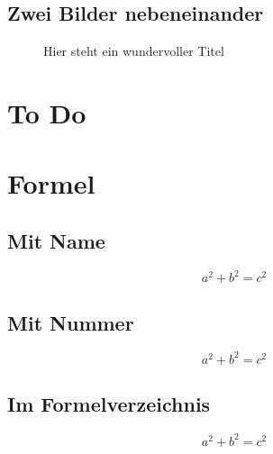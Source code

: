 \subsection{Zwei Bilder nebeneinander}
\begin{figure}[H]
	\centering
	\hspace{1em} %
	
	\label{Image:Beispiel2}
	\caption{Hier steht ein wundervoller Titel}
\end{figure}

\section{To Do}

\section{Formel}
\subsection{Mit Name}
\begin{equation}
	\tag{Satz des Pythagoras}
	a^2 + b^2 = c^2
	\label{equation:SatzDesPythagoras}
\end{equation}

\subsection{Mit Nummer}
\begin{equation}
	a^2 + b^2 = c^2
	\label{equation:SatzDesPythagoras}
\end{equation}

\subsection{Im Formelverzeichnis}
\begin{equation}
	a^2+b^2=c^2
\end{equation}

